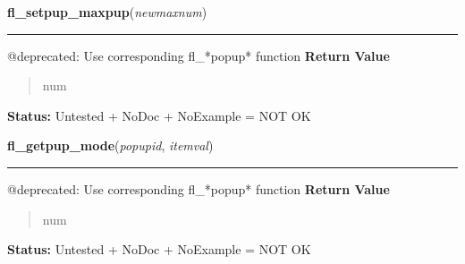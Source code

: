     \vspace{0.5ex}

\hspace{.8\funcindent}\begin{boxedminipage}{\funcwidth}

    \raggedright \textbf{fl\_setpup\_maxpup}(\textit{newmaxnum})

    \vspace{-1.5ex}

    \rule{\textwidth}{0.5\fboxrule}
\setlength{\parskip}{2ex}

@deprecated: Use corresponding fl\_*popup* function
\setlength{\parskip}{1ex}
      \textbf{Return Value}
    \vspace{-1ex}

      \begin{quote}

num
      \end{quote}

\textbf{Status:} 
Untested + NoDoc + NoExample = NOT OK


    \end{boxedminipage}

    \label{xformslib:deprecated:fl_getpup_mode}

    \vspace{0.5ex}

\hspace{.8\funcindent}\begin{boxedminipage}{\funcwidth}

    \raggedright \textbf{fl\_getpup\_mode}(\textit{popupid}, \textit{itemval})

    \vspace{-1.5ex}

    \rule{\textwidth}{0.5\fboxrule}
\setlength{\parskip}{2ex}

@deprecated: Use corresponding fl\_*popup* function
\setlength{\parskip}{1ex}
      \textbf{Return Value}
    \vspace{-1ex}

      \begin{quote}

num
      \end{quote}

\textbf{Status:} 
Untested + NoDoc + NoExample = NOT OK


    \end{boxedminipage}

